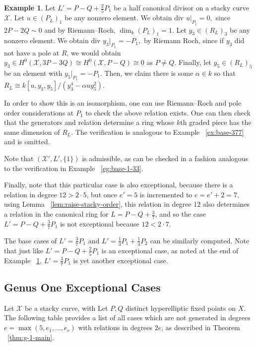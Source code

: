 \documentclass{amsart}
\theoremstyle{plain}
\theoremstyle{definition}
\newtheorem{example}[thm]{Example}
\theoremstyle{remark}
\numberwithin{equation}{section}
\newcommand\ssec{\subsection}
\newcommand \sx{\mathscr X}
\newcommand \di{\text{div }}
\newcommand \halfcan{L}
\begin{document}
\begin{example}
\label{eg:exception-1-5}
Let $L' = P - Q + \frac{2}{5}P_1$ be a half canonical divisor on a stacky curve $\sx$. Let $u \in (P_L)_1$ be any nonzero element. We obtain $\di u|_{P_1} = 0,$ since $2P -2Q \sim 0$ and by Riemann--Roch, $\dim_k (P_L)_1 = 1.$ Let $y_3 \in (R_L)_3$ be any nonzero element. We obtain $\di y_3|_{P_1} = - P_1,$ by Riemann Roch, since if $y_3$ did not have a pole at $R$, we would obtain $y_3 \in H^0(\sx,3P-3Q) \cong H^0(\sx, P - Q) \cong 0$ as $P \neq Q$. Finally, let $y_5 \in (R_L)_5$ be an element with $y_5|_{P_1} = -P_1$. Then, we claim there is some $\alpha \in k$ so that
$R_L \cong k[u, y_3, y_5]/(y_3^4 - \alpha uy_5^2).$

In order to show this is an isomorphism, one can use Riemann--Roch and pole order considerations at $P_1$ to check the above relation exists. One can then check that the generators and relation determine a ring whose $k$th graded piece has the same dimension of $R_L$. The verification is analogous to Example ~\ref{ex:base-377} and is omitted.

Note that $(\sx', \halfcan', \{1\})$ is admissible, as can be checked in a fashion analogous to the verification in Example ~\ref{eg:base-1-33}.

Finally, note that this particular case is also exceptional, because there is a relation in degree $12 > 2 \cdot 5$, but once $e' = 5$ is incremented to $e = e'+2 = 7,$ using Lemma ~\ref{lem:raise-stacky-order}, this relation in degree 12 also determines a relation in the canonical ring for $L = P - Q + \frac{3}{7}$, and so the case $L' = P - Q + \frac{3}{7}P_1$ is not exceptional because $12 < 2 \cdot 7$.
\end{example}




The base cases of $L' = \frac{3}{7}P_1$ and $L' = \frac{1}{3}P_1 +\frac{1}{3}P_2$ can be similarly computed. Note that just like $L' = P - Q + \frac{2}{5}P_1$ is an exceptional case, as noted at the end of Example ~\ref{eg:exception-1-5}, $L' = \frac{3}{7}P_1$ is yet another exceptional case.


\ssec{Genus One Exceptional Cases}
\label{ssec:g-1-exceptional}
Let $\sx$ be a stacky curve, with Let $P,Q$ distinct hyperelliptic fixed points on $X$. The following table provides a list of all cases which are not generated in degrees $e=\max(5,e_1,\ldots, e_r)$ with relations in degrees $2e$, as described in Theorem ~\ref{thm:g-1-main}.
\end{document}
